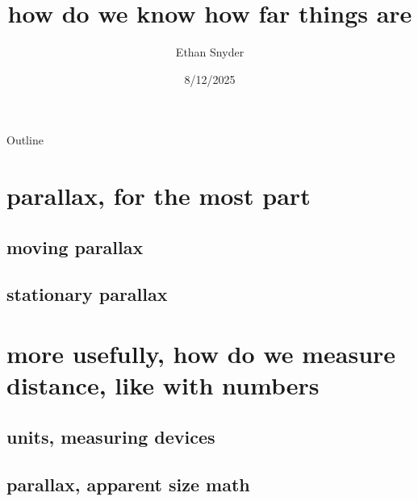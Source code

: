 \documentclass[12pt]{beamer}
\title{how do we know how far things are}
\author{Ethan Snyder}
\date{8/12/2025}
\begin{document}
\begin{frame}
    \titlepage
\end{frame}

\begin{frame}{Outline}
    \tableofcontents
\end{frame}

\section{parallax, for the most part}
\subsection{moving parallax}

\subsection{stationary parallax}

\section{more usefully, how do we measure distance, like with numbers}
\subsection{units, measuring devices}
\subsection{parallax, apparent size math}
\end{document}
